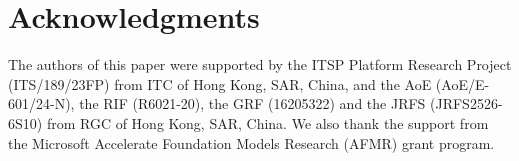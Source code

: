 \documentclass[11pt]{article}
\begin{document}
\section*{Acknowledgments}
The authors of this paper were supported by the ITSP Platform Research Project (ITS/189/23FP) from ITC of Hong Kong, SAR, China, and the AoE (AoE/E-601/24-N), the RIF (R6021-20), the GRF (16205322) and the JRFS (JRFS2526-6S10) from RGC of Hong Kong, SAR, China. We also thank the support from the Microsoft Accelerate Foundation Models Research (AFMR) grant program.


\end{document}
